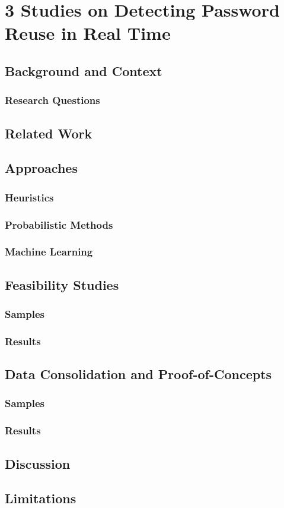\chapter[Three Studies on Detecting Password Reuse in Real Time]{3 Studies on Detecting Password Reuse in Real Time}

\section{Background and Context}

\subsection{Research Questions}

\section{Related Work}

\section{Approaches}
\subsection{Heuristics}
\subsection{Probabilistic Methods}
\subsection{Machine Learning}


\section{Feasibility Studies}

\subsection{Samples}
\subsection{Results}

\section{Data Consolidation and Proof-of-Concepts}


\subsection{Samples}
\subsection{Results}

\section{Discussion}



\section{Limitations}

